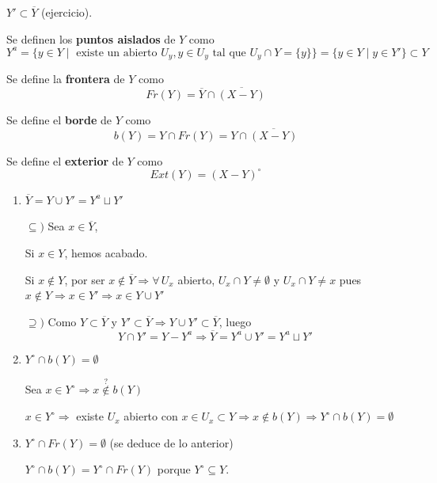 \begin{obs}
    $Y' \subset \overline{Y}$ (ejercicio).
\end{obs}
\begin{defi}Se definen los \textbf{puntos aislados} de $Y$ como
    $$Y^a = \{y\in Y \mid \text{ existe un abierto } U_y, y\in U_y \text{ tal que } U_y \cap Y = \{y\} \} = \{y \in Y \mid y \in Y'\}\subset Y$$
\end{defi}
\begin{defi}
    Se define la \textbf{frontera} de $Y$ como 
    $$Fr(Y) = \overline{Y} \cap \overline{(X-Y)}$$
\end{defi}
\begin{defi}
    Se define el \textbf{borde} de $Y$ como 
    $$b(Y) = Y \cap Fr(Y) = Y \cap \overline{(X-Y)}$$ 
\end{defi}
\begin{defi}
    Se define el \textbf{exterior} de $Y$ como 
    $$Ext(Y)=(X-Y)^{\circ}$$
\end{defi}
\begin{propis}
\begin{enumerate}
    \item $\overline{Y} = Y \cup Y' = Y^a \sqcup Y'$
    \begin{dem}
        $\subseteq) $ Sea $x\in \overline{Y}$, 

        Si $x\in Y$, hemos acabado.

        Si $x\nin Y$, por ser $x\nin \overline{Y} \Rightarrow \forall\, U_x$ abierto, $U_x\cap Y \neq \emptyset$ y $U_x\cap Y \neq x$ pues $x\nin Y \Rightarrow x\in Y' \Rightarrow x\in Y \cup Y'$

        $\supseteq)$ Como $Y \subset \overline{Y}$ y $Y' \subset \overline{Y} \Rightarrow Y \cup Y' \subset \overline{Y}$, luego
        $$Y\cap Y' = Y-Y^a \Rightarrow \overline{Y} = Y^a \cup Y' = Y^a \sqcup Y'$$
    \end{dem}
    \item $Y^{\circ} \cap b(Y) = \emptyset$
    \begin{dem}
        Sea $x\in Y^{\circ} \Rightarrow x \overset{?}{\nin} b(Y)$

        $x\in Y^{\circ} \Rightarrow$ existe $U_x$ abierto con $x\in U_x \subset Y \Rightarrow x\nin b(Y) \Rightarrow Y^{\circ} \cap b(Y) = \emptyset$
    \end{dem}
    \item $Y^{\circ} \cap Fr(Y) = \emptyset$ (se deduce de lo anterior)
    
    $Y^{\circ} \cap b(Y)  = Y^{\circ} \cap Fr(Y)$ porque $Y^{\circ} \subseteq Y$.
\end{enumerate}
\end{propis}



